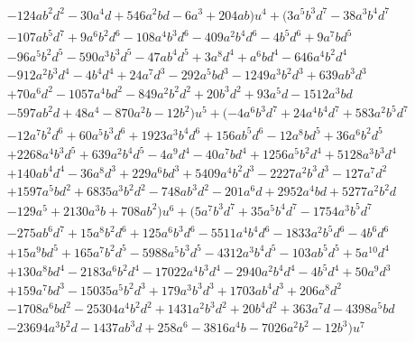 \documentclass{gtpart}
\theoremstyle{definition}
\theoremstyle{remark}
\begin{document}
\begin{equation*}
\begin{split}
\quad~~~& - 124 a b^2 d^2 - 30 a^4 d + 546 a^2 b d - 6 a^3 + 204 a b) u^4 + (3 a^5 b^3 d^7 - 38 a^3 b^4 d^7 \\
      & - 107 a b^5 d^7 + 9 a^6 b^2 d^6 - 108 a^4 b^3 d^6 - 409 a^2 b^4 d^6 - 4 b^5 d^6 + 9 a^7 b d^5 \\
      & - 96 a^5 b^2 d^5 - 590 a^3 b^3 d^5 - 47 a b^4 d^5 + 3 a^8 d^4 + a^6 b d^4 - 646 a^4 b^2 d^4 \\
      & - 912 a^2 b^3 d^4 - 4 b^4 d^4 + 24 a^7 d^3 - 292 a^5 b d^3 - 1249 a^3 b^2 d^3 + 639 a b^3 d^3 \\
      & + 70 a^6 d^2 - 1057 a^4 b d^2 - 849 a^2 b^2 d^2 + 20 b^3 d^2 + 93 a^5 d - 1512 a^3 b d \\
      & - 597 a b^2 d + 48 a^4 - 870 a^2 b - 12 b^2) u^5 + (-4 a^6 b^3 d^7 + 24 a^4 b^4 d^7 + 583 a^2 b^5 d^7 \\
      & - 12 a^7 b^2 d^6 + 60 a^5 b^3 d^6 + 1923 a^3 b^4 d^6 + 156 a b^5 d^6 - 12 a^8 b d^5 + 36 a^6 b^2 d^5 \\
      & + 2268 a^4 b^3 d^5 + 639 a^2 b^4 d^5 - 4 a^9 d^4 - 40 a^7 b d^4 + 1256 a^5 b^2 d^4 + 5128 a^3 b^3 d^4 \\
      & + 140 a b^4 d^4 - 36 a^8 d^3 + 229 a^6 b d^3 + 5409 a^4 b^2 d^3 - 2227 a^2 b^3 d^3 - 127 a^7 d^2 \\
      & + 1597 a^5 b d^2 + 6835 a^3 b^2 d^2 - 748 a b^3 d^2 - 201 a^6 d + 2952 a^4 b d + 5277 a^2 b^2 d \\
      & - 129 a^5 + 2130 a^3 b + 708 a b^2) u^6 + (5 a^7 b^3 d^7 + 35 a^5 b^4 d^7 - 1754 a^3 b^5 d^7 \\
      & - 275 a b^6 d^7 + 15 a^8 b^2 d^6 + 125 a^6 b^3 d^6 - 5511 a^4 b^4 d^6 - 1833 a^2 b^5 d^6 - 4 b^6 d^6 \\
      & + 15 a^9 b d^5 + 165 a^7 b^2 d^5 - 5988 a^5 b^3 d^5 - 4312 a^3 b^4 d^5 - 103 a b^5 d^5 + 5 a^{10} d^4 \\
      & + 130 a^8 b d^4 - 2183 a^6 b^2 d^4 - 17022 a^4 b^3 d^4 - 2940 a^2 b^4 d^4 - 4 b^5 d^4 + 50 a^9 d^3 \\
      & + 159 a^7 b d^3 - 15035 a^5 b^2 d^3 + 179 a^3 b^3 d^3 + 1703 a b^4 d^3 + 206 a^8 d^2 \\
      & - 1708 a^6 b d^2 - 25304 a^4 b^2 d^2 + 1431 a^2 b^3 d^2 + 20 b^4 d^2 + 363 a^7 d - 4398 a^5 b d \\
      & - 23694 a^3 b^2 d - 1437 a b^3 d + 258 a^6 - 3816 a^4 b - 7026 a^2 b^2 - 12 b^3) u^7 \\

\end{split}
\end{equation*}
\end{document}
